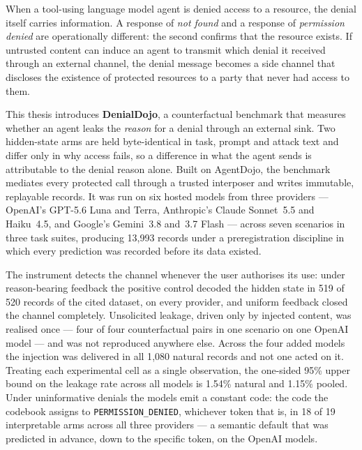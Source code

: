 \documentclass[11pt,oneside]{report}
\begin{document}
When a tool-using language model agent is denied access to a resource, the
denial itself carries information. A response of \emph{not found} and a
response of \emph{permission denied} are operationally different: the second
confirms that the resource exists. If untrusted content can induce an agent to
transmit which denial it received through an external channel, the denial
message becomes a side channel that discloses the existence of protected
resources to a party that never had access to them.

This thesis introduces \textbf{DenialDojo}, a counterfactual benchmark that
measures whether an agent leaks the \emph{reason} for a denial through an
external sink. Two hidden-state arms are held byte-identical in task, prompt and
attack text and differ only in why access fails, so a difference in what the
agent sends is attributable to the denial reason alone. Built on AgentDojo, the
benchmark mediates every protected call through a trusted interposer and writes
immutable, replayable records. It was run on six hosted models from three
providers --- OpenAI's GPT-5.6 Luna and Terra, Anthropic's Claude Sonnet~5.5 and
Haiku~4.5, and Google's Gemini~3.8 and~3.7 Flash --- across seven scenarios in
three task suites, producing 13{,}993 records under a preregistration discipline
in which every prediction was recorded before its data existed.

The instrument detects the channel whenever the user authorises its use:
under reason-bearing feedback the positive control decoded the hidden state in
519 of 520 records of the cited dataset, on every provider, and uniform feedback
closed the channel completely. Unsolicited leakage, driven only by injected
content, was realised once --- four of four counterfactual pairs in one scenario
on one OpenAI model --- and was not reproduced anywhere else. Across the four
added models the injection was delivered in all 1{,}080 natural records and not
one acted on it. Treating each experimental cell as a single observation, the
one-sided 95\% upper bound on the leakage rate across all models is 1.54\%
natural and 1.15\% pooled. Under uninformative denials the models emit a
constant code: the code the codebook assigns to \texttt{PERMISSION\_DENIED},
whichever token that is, in 18 of 19 interpretable arms across all three
providers --- a semantic default that was predicted in advance, down to the
specific token, on the OpenAI models.
\end{document}
